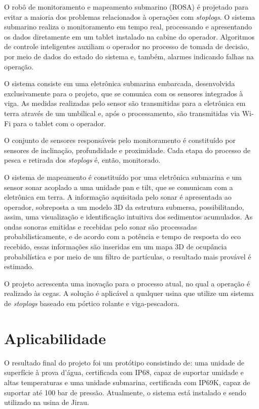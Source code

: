 O robô de monitoramento e mapeamento submarino (ROSA) é projetado para evitar a
maioria dos problemas relacionados à operações com \textit{stoplogs}. O sistema
submarino realiza o monitoramento em tempo real, processando e apresentando os
dados diretamente em um tablet instalado na cabine do operador. Algoritmos de
controle inteligentes auxiliam o operador no processo de tomada de decisão,
por meio de dados do estado do sistema e, também, alarmes indicando falhas na
operação.

O sistema consiste em uma eletrônica submarina embarcada, desenvolvida
exclusivamente para o projeto, que se comunica com os sensores integrados à
viga. As medidas realizadas pelo sensor são transmitidas para a
eletrônica em terra através de um umbilical e, após o processamento, são
transmitidas via Wi-Fi para o tablet com o operador.

O conjunto de sensores responsáveis pelo monitoramento é constituído por
sensores de inclinação, profundidade e proximidade. Cada etapa do processo de
pesca e retirada dos \textit{stoplogs} é, então, monitorado.

O sistema de mapeamento é constituído por uma eletrônica submarina e um sensor
sonar acoplado a uma unidade pan e tilt, que se comunicam com a eletrônica em
terra.
A informação aquisitada pelo sonar é apresentada ao operador, sobreposta a um 
modelo 3D da estrutura submersa, possibilitando, assim, uma
visualização e identificação intuitiva dos sedimentos acumulados.
As ondas sonoras emitidas e recebidas pelo sonar são processadas 
probabilisticamente, e de acordo com a potência e tempo de resposta
do eco recebido, essas informações são inseridas em um mapa 3D de ocupância
probabilística e por meio de um filtro de partículas, o resultado mais provável
é estimado.

O projeto acrescenta uma inovação para o processo atual, no qual a operação é
realizado às cegas. A solução é aplicável a qualquer usina que utilize um
sistema de \textit{stoplogs} baseado em pórtico rolante e viga-pescadora.


\section{Aplicabilidade}

O resultado final do projeto foi um protótipo consistindo de: uma unidade de
superfície à prova d'água, certificada com IP68, capaz de suportar umidade e
altas temperaturas e uma unidade submarina, certificada com IP69K, capaz de
suportar até 100 bar de pressão. Atualmente, o sistema está instalado e sendo
utilizado na usina de Jirau.

